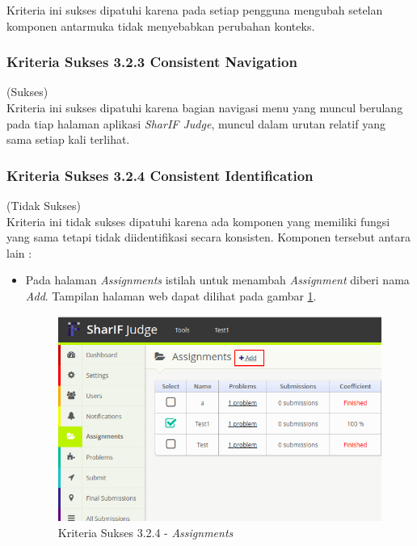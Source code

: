 \documentclass[a4paper,twoside]{article}
\begin{document}
\begin{enumerate}
		Kriteria ini sukses dipatuhi karena pada setiap pengguna mengubah setelan komponen antarmuka tidak menyebabkan perubahan konteks.
		
		\subsubsection*{Kriteria Sukses 3.2.3 Consistent Navigation}
		\label{subsubsec:kepatuhan_kriteria_3.2.3}
		(Sukses) \\
		
		Kriteria ini sukses dipatuhi karena bagian navigasi menu yang muncul berulang pada tiap halaman aplikasi \textit{SharIF Judge}, muncul dalam urutan relatif yang sama setiap kali terlihat.
		
		\subsubsection*{Kriteria Sukses 3.2.4 Consistent Identification}
		\label{subsubsec:kepatuhan_kriteria_3.2.4}
		(Tidak Sukses) \\
		
		Kriteria ini tidak sukses dipatuhi karena ada komponen yang memiliki fungsi yang sama tetapi tidak diidentifikasi secara konsisten. Komponen tersebut antara lain :
		
		\begin{itemize}
			\item Pada halaman \textit{Assignments} istilah untuk menambah \textit{Assignment} diberi nama \textit{Add}. Tampilan halaman web dapat dilihat pada gambar \ref{fig:kepatuhan_3_2_4_assignments}.
			\begin{figure}[H]
				\centering  
				\includegraphics[scale=0.5]{kepatuhan_3_2_4_assignments}  
				\caption[Kriteria Sukses 3.2.4 - \textit{Assignments}]{Kriteria Sukses 3.2.4 - \textit{Assignments}} 
				\label{fig:kepatuhan_3_2_4_assignments} 
			\end{figure}
			

\end{itemize}
\end{enumerate}
\end{document}
